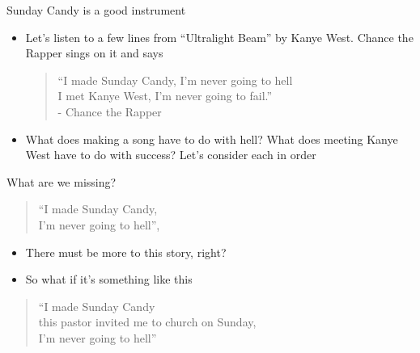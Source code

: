 \documentclass{beamer}
\begin{document}
\begin{frame}{Sunday Candy is a good instrument}

  \begin{itemize}
    \item Let's listen to a few lines from ``Ultralight Beam'' by Kanye West. Chance the Rapper sings on it and says

          \begin{quote}
            ``I made Sunday Candy, I'm never going to hell \\


            I met Kanye West, I'm never going to fail.'' \\


            - Chance the Rapper
          \end{quote}

    \item What does making a song have to do with hell?  What does meeting Kanye West have to do with success? Let's consider each in order
  \end{itemize}
\end{frame}

\begin{frame}{What are we missing?}

  \begin{quote}
    ``I made Sunday Candy, \\
    I'm never going to hell'',
  \end{quote}
  \begin{itemize}
    \item There must be more to this story, right?
    \item So what if it's something like this
  \end{itemize}
  \begin{quote}
    ``I made Sunday Candy \\
    this pastor invited me to church on Sunday, \\
    I'm never going to hell''
  \end{quote}

\end{frame}
\end{document}
